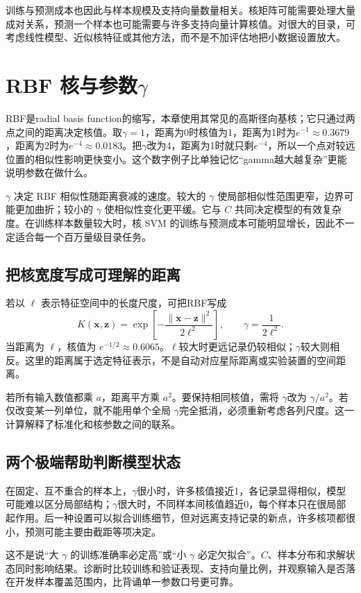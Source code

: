 训练与预测成本也因此与样本规模及支持向量数量相关。核矩阵可能需要处理大量成对关系，预测一个样本也可能需要与许多支持向量计算核值。对很大的目录，可考虑线性模型、近似核特征或其他方法，而不是不加评估地把小数据设置放大。

\section{RBF 核与参数\texorpdfstring{$\gamma$}{gamma}}

RBF是radial basis function的缩写，本章使用其常见的高斯径向基核；它只通过两点之间的距离决定核值。取$\gamma=1$，距离为0时核值为1，距离为1时为$e^{-1}\approx0.3679$，距离为2时为$e^{-4}\approx0.0183$。把$\gamma$改为4，距离为1时就只剩$e^{-4}$，所以一个点对较远位置的相似性影响更快变小。这个数字例子比单独记忆“gamma越大越复杂”更能说明参数在做什么。

$\gamma$ 决定 RBF 相似性随距离衰减的速度。较大的 $\gamma$ 使局部相似性范围更窄，边界可能更加曲折；较小的 $\gamma$ 使相似性变化更平缓。它与 $C$ 共同决定模型的有效复杂度。在训练样本数量较大时，核 SVM 的训练与预测成本可能明显增长，因此不一定适合每一个百万量级目录任务。

\subsection{把核宽度写成可理解的距离}
若以 $\ell$ 表示特征空间中的长度尺度，可把RBF写成
\[
K(\mathbf x,\mathbf z)=\exp\left[-\frac{\|\mathbf x-\mathbf z\|^2}{2\ell^2}\right],
\qquad\gamma=\frac1{2\ell^2}.
\]
当距离为 $\ell$，核值为 $e^{-1/2}\approx0.6065$。$\ell$较大时更远记录仍较相似；$\gamma$较大则相反。这里的距离属于选定特征表示，不是自动对应星际距离或实验装置的空间距离。

若所有输入数值都乘 $a$，距离平方乘 $a^2$。要保持相同核值，需将 $\gamma$改为 $\gamma/a^2$。若仅改变某一列单位，就不能用单个全局 $\gamma$完全抵消，必须重新考虑各列尺度。这一计算解释了标准化和核参数之间的联系。

\subsection{两个极端帮助判断模型状态}
在固定、互不重合的样本上，$\gamma$很小时，许多核值接近1，各记录显得相似，模型可能难以区分局部结构；$\gamma$很大时，不同样本间核值趋近0，每个样本只在很局部起作用。后一种设置可以拟合训练细节，但对远离支持记录的新点，许多核项都很小，预测可能主要由截距等项决定。

这不是说“大 $\gamma$ 的训练准确率必定高”或“小 $\gamma$ 必定欠拟合”。$C$、样本分布和求解状态同时影响结果。诊断时比较训练和验证表现、支持向量比例，并观察输入是否落在开发样本覆盖范围内，比背诵单一参数口号更可靠。

